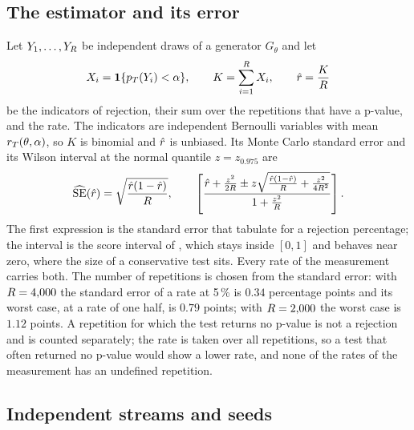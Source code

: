 

\subsection{The estimator and its error}
\label{sec:pm-estimator}

Let $Y_1,\dots,Y_R$ be independent draws of a generator $G_\theta$ and let
\begin{equation}
X_i=\mathbf{1}\{p_T(Y_i)<\alpha\},\qquad K=\sum_{i=1}^{R}X_i,\qquad \hat{r}=\frac{K}{R}
\label{eq:rate}
\end{equation}
be the indicators of rejection, their sum over the repetitions that have a p-value, and the rate.
The indicators are independent Bernoulli variables with mean $r_T(\theta,\alpha)$, so $K$ is binomial and $\hat{r}$ is unbiased.
Its Monte Carlo standard error and its Wilson interval at the normal quantile $z=z_{0.975}$ are
\begin{equation}
\widehat{\mathrm{SE}}(\hat{r})=\sqrt{\frac{\hat{r}(1-\hat{r})}{R}},\qquad
\left[\frac{\hat{r}+\frac{z^2}{2R}\pm z\sqrt{\frac{\hat{r}(1-\hat{r})}{R}+\frac{z^2}{4R^2}}}{1+\frac{z^2}{R}}\right].
\label{eq:se-wilson}
\end{equation}
The first expression is the standard error that \citet{morris2019} tabulate for a rejection percentage; the interval is the score interval of \citet{wilson1927}, which stays inside $[0,1]$ and behaves near zero, where the size of a conservative test sits.
Every rate of the measurement carries both.
The number of repetitions is chosen from the standard error: with $R=4{,}000$ the standard error of a rate at 5\,\% is $0.34$ percentage points and its worst case, at a rate of one half, is $0.79$ points; with $R=2{,}000$ the worst case is $1.12$ points. A repetition for which the test returns no p-value is not a rejection and is counted separately; the rate is taken over all repetitions, so a test that often returned no p-value would show a lower rate, and none of the \nRates{} rates of the measurement has an undefined repetition.

\subsection{Independent streams and seeds}
\label{sec:pm-streams}

